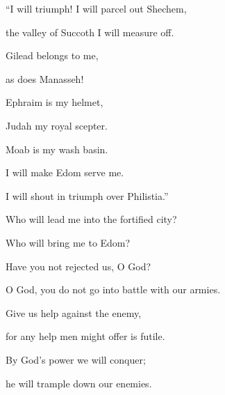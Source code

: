 {\par }{\Q “I will triumph! I will parcel
out Shechem,
\par }{\Q the valley
of Succoth
I will measure off.
\par }{\Q {}Gilead
belongs to me,
\par }{\Q as does Manasseh!

\par }{\Q Ephraim
is my helmet,
\par }{\Q Judah
my royal scepter.
\par }{\Q {}Moab
is my wash basin.
\par }{\Q I will make
Edom
serve
me.

\par }{\Q I will shout in triumph
over
Philistia.”
\par }{\Q {}Who
will lead me into
the fortified
city?
\par }{\Q Who
will bring me
to Edom?
\par }{\Q {}Have you not
rejected
us, O God?
\par }{\Q O God,
you do not
go
into battle with our armies.
\par }{\Q {}Give
us help
against the enemy,
\par }{\Q for any help
men
might offer is futile.
\par }{\Q {}By God’s
power
we will conquer;
\par }{\Q he
will trample down
our enemies.


\par }
